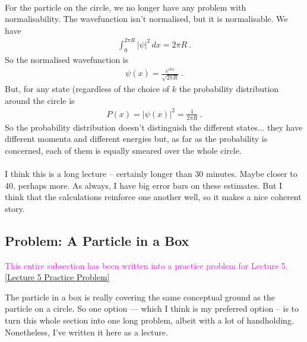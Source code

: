 \documentclass[12pt]{article}
\def\be{\begin{eqnarray}}
\def\ee{\end{eqnarray}}
\newcommand{\nn}{\nonumber}
\newcommand\para{\paragraph{}}
\newcommand{\alyssa}{\textcolor{magenta}}
\begin{document}
\para
For the particle on the circle, we no longer have any problem with normalisability. The wavefunction isn't normalised, but it is normalisable. {\color{olive} We have
%
\be \int_0^{2\pi R} |\psi|^2 \,dx = 2\pi R\ .\nn\ee
%
So the normalised wavefunction is
%
\be \psi(x) = \frac{e^{ikx}}{\sqrt{2\pi R}}\ .\ee
%
But, for any state} (regardless of the choice of $k$ {\color{olive} the probability distribution around the circle is
%
\be P(x) = |\psi(x)|^2 = \frac{1}{2\pi R}\ .\nn\ee
} 
So the probability distribution doesn't distinguish the different states... they have different momenta and different energies but, as far as the probability is concerned, each of them is equally smeared over the whole circle.

\para
{\color{red} I think this is a long lecture -- certainly longer than 30 minutes. Maybe closer to 40, perhaps more. As always, I have big error bars on these estimates.  But I think that the calculations reinforce one another well, so it makes a nice coherent story.}


\subsection{Problem: A Particle in a Box}
\alyssa{This entire subsection has been written into a practice problem for Lecture 5.} \href{https://drive.google.com/file/d/1KrovFFhp2vBc-8qHwI2lAaeIfoWElGgC/view?usp=drive_link}{[Lecture 5 Practice Problem]}

{\color{blue} The particle in a box is really covering the same conceptual ground as the particle on a circle. So one option --- which I think is my preferred option -- is to turn this whole section into one long problem, albeit with a lot of handholding. Nonetheless, I've written it here as a lecture.}
\end{document}
